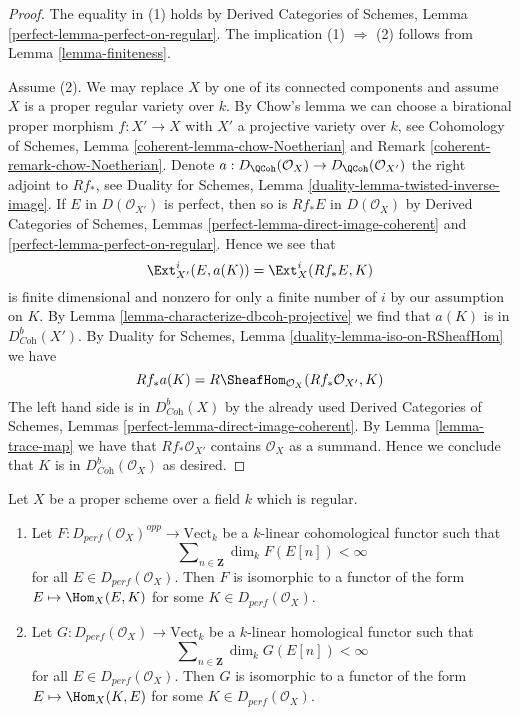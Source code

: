\begin{proof}
The equality in (1) holds by Derived Categories of Schemes,
Lemma \ref{perfect-lemma-perfect-on-regular}.
The implication (1) $\Rightarrow$ (2) follows from
Lemma \ref{lemma-finiteness}.

\medskip\noindent
Assume (2). We may replace $X$ by one of its connected components
and assume $X$ is a proper regular variety over $k$.
By Chow's lemma we can choose a birational proper morphism
$f : X' \to X$ with $X'$ a projective variety over $k$, see
Cohomology of Schemes, Lemma \ref{coherent-lemma-chow-Noetherian}
and Remark \ref{coherent-remark-chow-Noetherian}.
Denote $a : D_\QCoh(\mathcal{O}_X) \to D_\QCoh(\mathcal{O}_{X'})$
the right adjoint to $Rf_*$, see
Duality for Schemes, Lemma \ref{duality-lemma-twisted-inverse-image}.
If $E$ in $D(\mathcal{O}_{X'})$ is perfect, then so is
$Rf_*E$ in $D(\mathcal{O}_X)$ by
Derived Categories of Schemes, Lemmas
\ref{perfect-lemma-direct-image-coherent} and
\ref{perfect-lemma-perfect-on-regular}.
Hence we see that
$$
\Ext^i_{X'}(E, a(K)) = \Ext^i_X(Rf_*E, K)
$$
is finite dimensional and nonzero for only a finite number of $i$
by our assumption on $K$. By
Lemma \ref{lemma-characterize-dbcoh-projective}
we find that $a(K)$ is in $D^b_{\textit{Coh}}(X')$.
By Duality for Schemes, Lemma \ref{duality-lemma-iso-on-RSheafHom} we have
$$
Rf_*a(K) = R\SheafHom_{\mathcal{O}_X}(Rf_*\mathcal{O}_{X'}, K)
$$
The left hand side is in $D^b_{\textit{Coh}}(X)$ by the already used
Derived Categories of Schemes, Lemmas
\ref{perfect-lemma-direct-image-coherent}.
By Lemma \ref{lemma-trace-map} we have that $Rf_*\mathcal{O}_{X'}$
contains $\mathcal{O}_X$ as a summand. Hence we conclude that
$K$ is in $D^b_{\textit{Coh}}(\mathcal{O}_X)$
as desired.
\end{proof}

\begin{lemma}
\label{lemma-bondal-van-den-bergh}
Let $X$ be a proper scheme over a field $k$ which is regular.
\begin{enumerate}
\item Let $F : D_{perf}(\mathcal{O}_X)^{opp} \to \text{Vect}_k$
be a $k$-linear cohomological functor such that
$$
\sum\nolimits_{n \in \mathbf{Z}} \dim_k F(E[n]) < \infty
$$
for all $E \in D_{perf}(\mathcal{O}_X)$. Then $F$ is isomorphic to a functor
of the form $E \mapsto \Hom_X(E, K)$ for some $K \in D_{perf}(\mathcal{O}_X)$.
\item Let $G : D_{perf}(\mathcal{O}_X) \to \text{Vect}_k$
be a $k$-linear homological functor such that
$$
\sum\nolimits_{n \in \mathbf{Z}} \dim_k G(E[n]) < \infty
$$
for all $E \in D_{perf}(\mathcal{O}_X)$. Then $G$ is isomorphic to a functor
of the form $E \mapsto \Hom_X(K, E)$ for some $K \in D_{perf}(\mathcal{O}_X)$.
\end{enumerate}
\end{lemma}

